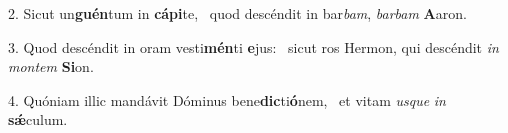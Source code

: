 2. Sicut un\textbf{guén}tum in \textbf{cá}\textbf{pi}te, \ast\  quod descéndit in bar\textit{bam}, \textit{bar}\textit{bam} \textbf{A}aron.\

3. Quod descéndit in oram vesti\textbf{mén}ti \textbf{e}jus: \ast\  sicut ros Hermon, qui descéndit \textit{in} \textit{mon}\textit{tem} \textbf{Si}on.\

4. Quóniam illic mandávit Dóminus bene\textbf{dic}ti\textbf{ó}nem, \ast\  et vitam \textit{us}\textit{que} \textit{in} \textbf{sǽ}culum.\

